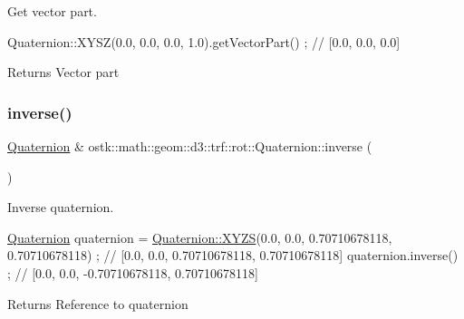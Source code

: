 Get vector part. 


\begin{DoxyCode}
Quaternion::XYSZ(0.0, 0.0, 0.0, 1.0).getVectorPart() ; \textcolor{comment}{// [0.0, 0.0, 0.0]}
\end{DoxyCode}


\begin{DoxyReturn}{Returns}
Vector part 
\end{DoxyReturn}
\mbox{\label{classostk_1_1math_1_1geom_1_1d3_1_1trf_1_1rot_1_1_quaternion_a75b09159acd3346e3ad848b0162181f4}} 
\subsubsection{\texorpdfstring{inverse()}{inverse()}}
{\footnotesize\ttfamily \hyperlink{classostk_1_1math_1_1geom_1_1d3_1_1trf_1_1rot_1_1_quaternion}{Quaternion} \& ostk\+::math\+::geom\+::d3\+::trf\+::rot\+::\+Quaternion\+::inverse (\begin{DoxyParamCaption}{ }\end{DoxyParamCaption})}



Inverse quaternion. 


\begin{DoxyCode}
\hyperlink{classostk_1_1math_1_1geom_1_1d3_1_1trf_1_1rot_1_1_quaternion_ad9fd7d8eb5effb4d4e0394bbb5bb86dc}{Quaternion} quaternion = \hyperlink{classostk_1_1math_1_1geom_1_1d3_1_1trf_1_1rot_1_1_quaternion_ac57ea57a4033622ed1389101b2e58c76}{Quaternion::XYZS}(0.0, 0.0, 0.70710678118, 0.70710678118) 
      ; \textcolor{comment}{// [0.0, 0.0, 0.70710678118, 0.70710678118]}
quaternion.inverse() ; \textcolor{comment}{// [0.0, 0.0, -0.70710678118, 0.70710678118]}
\end{DoxyCode}


\begin{DoxyReturn}{Returns}
Reference to quaternion 
\end{DoxyReturn}
\mbox{\label{classostk_1_1math_1_1geom_1_1d3_1_1trf_1_1rot_1_1_quaternion_a4d605d7242ef08aa841ab41df4e06a17}} 
